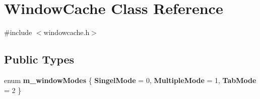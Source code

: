 \hypertarget{classWindowCache}{
\section{WindowCache Class Reference}
\label{classWindowCache}
}


{\ttfamily \#include $<$windowcache.h$>$}\subsection*{Public Types}
\begin{DoxyCompactItemize}
\item 
enum {\bfseries m\_\-windowModes} \{ {\bfseries SingelMode} =  0, 
{\bfseries MultipleMode} =  1, 
{\bfseries TabMode} =  2
 \}
\end{DoxyCompactItemize}
